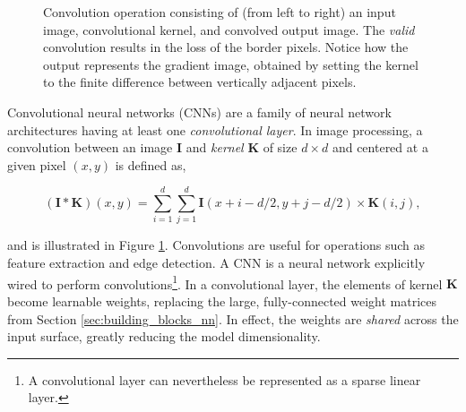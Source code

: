 \begin{figure}[h]


\caption{Convolution operation consisting of (from left to right) an input image, convolutional kernel, and convolved output image. The \emph{valid} convolution results in the loss of the border pixels. Notice how the output represents the gradient image, obtained by setting the kernel to the finite difference between vertically adjacent pixels.}
\label{fig:convolution_operation}
\end{figure}

Convolutional neural networks (CNNs) are a family of neural network architectures having at least one \emph{convolutional layer}. In image processing, a convolution between an image $\mathbf{I}$ and \emph{kernel} $\mathbf{K}$ of size $d \times d$ and centered at a given pixel $(x, y)$ is defined as,

\begin{equation}
(\mathbf{I} * \mathbf{K})(x, y) = \sum_{i = 1}^{d}\sum_{j = 1}^{d} \mathbf{I}(x + i -d/2, y + j - d/2) \times \mathbf{K}(i, j),
\label{eq:convolution_operation}
\end{equation}

and is illustrated in Figure \ref{fig:convolution_operation}. Convolutions are useful for operations such as feature extraction and edge detection. A CNN is a neural network explicitly wired to perform convolutions\footnote{A convolutional layer can nevertheless be represented as a sparse linear layer.}. In a convolutional layer, the elements of kernel $\mathbf{K}$ become learnable weights, replacing the large, fully-connected weight matrices from Section \ref{sec:building_blocks_nn}. In effect, the weights are \emph{shared} across the input surface, greatly reducing the model dimensionality.


